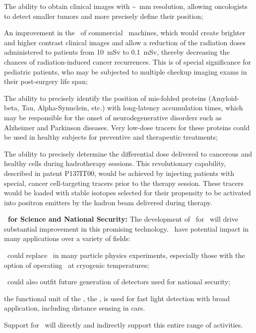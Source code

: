\begin{asparaenum}
\begin{compactenum}
\item The ability to obtain clinical images with \si{\sim\mm} resolution, allowing oncologists to detect smaller  tumors and more precisely define their position;
\item An improvement in the \SNR\ of commercial \TOFPET\ machines, which would create brighter and higher contrast clinical images and allow a reduction of the radiation doses administered to patients from \SI{10}{\milli\sievert} to \SI{0.1}{\milli\sievert}, thereby decreasing the chances of radiation-induced cancer recurrences. This is of special significance for pediatric patients, who may be subjected to multiple checkup imaging exams in their post-surgery life span;
\item The ability to precisely identify the position of mis-folded proteins (Amyloid-beta, Tau, Alpha-Synuclein, etc.) with long-latency accumulation times, which may be responsible for the onset of neurodegenerative disorders such as Alzheimer and Parkinson diseases.  Very low-dose tracers for these proteins could be used in healthy subjects for preventive and therapeutic treatments;
\item The ability to precisely determine the differential dose delivered to cancerous and healthy cells during hadrotherapy sessions.  This revolutionary capability, described in patent P137IT00, would be achieved by injecting patients with special, cancer cell-targeting tracers prior to the therapy session.  These tracers would be  loaded with stable isotopes selected for their propensity to be activated into positron emitters by the hadron beam delivered during therapy.
\end{compactenum}

\item[\bf \SiPMs\ for Science and National Security:] The development of \SiPMs\ for \DSks\ will drive substantial improvement in this promising technology.  \SiPMs\ have potential impact in many applications over a variety of fields:
\begin{inparadesc}
\item \SiPMs\ could replace \PMTs\ in many particle physics experiments, especially those with the option of operating \SiPMs\ at cryogenic temperatures;
\item \SiPMs\ could also outfit future generation of detectors used for national security;
\item the functional unit of the \SiPM, the \SPAD, is used for fast light detection with broad application, including distance sensing in cars.
\end{inparadesc}
Support for \DSk\ will directly and indirectly support this entire range of activities.


\end{asparaenum}
